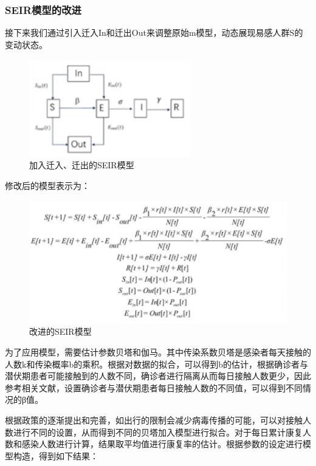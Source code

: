 \documentclass[12pt,hyperref,]{ctexart}
\begin{document}
\hypertarget{seirux6a21ux578bux7684ux6539ux8fdb}{%
\subsubsection{SEIR模型的改进}\label{seirux6a21ux578bux7684ux6539ux8fdb}}

接下来我们通过引入迁入In和迁出Out来调整原始m模型，动态展现易感人群S的变动状态。

\begin{figure}
\includegraphics[width=2.78in]{image/4.2.2} \caption{加入迁入、迁出的SEIR模型}\label{fig:2}
\end{figure}

修改后的模型表示为：

\begin{figure}
\includegraphics[width=5.56in]{image/fom} \caption{改进的SEIR模型}\label{fig:3}
\end{figure}

为了应用模型，需要估计参数贝塔和伽马。其中传染系数贝塔是感染者每天接触的人数k和传染概率b的乘积。根据对数据的拟合，可以得到b的估计，根据确诊者与潜伏期患者可能接触到的人数不同，确诊者进行隔离从而每日接触人数更少，因此参考相关文献，设置确诊者与潜伏期患者每日接触人数的不同值，可以得到不同情况的β值。

根据政策的逐渐提出和完善，如出行的限制会减少病毒传播的可能，可以对接触人数进行不同的设置，从而得到不同的贝塔加入模型进行拟合。对于每日累计康复人数和感染人数进行计算，结果取平均值进行康复率的估计。根据参数的设定进行模型构造，得到如下结果：
\end{document}
